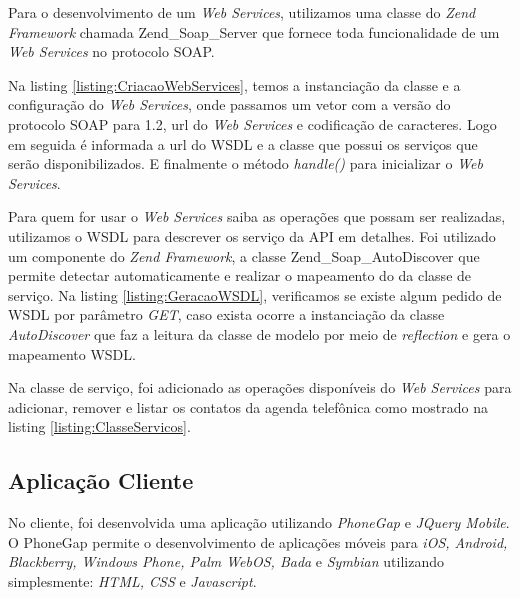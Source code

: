 \documentclass{acm_proc_article-sp}
\begin{document}
	Para o desenvolvimento de um \emph{Web Services}, utilizamos uma classe do \emph{Zend Framework} chamada Zend\_Soap\_Server que fornece toda funcionalidade de um \emph{Web Services} no protocolo SOAP. 
	
	Na listing \ref{listing:CriacaoWebServices}, temos a instanciação da classe e a configuração do \emph{Web Services}, onde passamos um vetor com a versão do protocolo SOAP para 1.2, url do \emph{Web Services} e codificação de caracteres. Logo em seguida é informada a url do WSDL e a classe que possui os serviços que serão disponibilizados. E finalmente o método \emph{handle()} para inicializar o \emph{Web Services}.
	
	
	
	Para quem for usar o \emph{Web Services} saiba as operações que possam ser realizadas, utilizamos o WSDL para descrever os serviço da API em detalhes. Foi utilizado um componente do \emph{Zend Framework}, a classe Zend\_Soap\_AutoDiscover que permite detectar automaticamente e realizar o mapeamento do da classe de serviço. Na listing \ref{listing:GeracaoWSDL}, verificamos se existe algum pedido de WSDL por parâmetro \emph{GET}, caso exista ocorre a instanciação da classe \emph{AutoDiscover} que faz a leitura da classe de modelo por meio de \emph{reflection} e gera o mapeamento WSDL.
	
	
	
	Na classe de serviço, foi adicionado as operações disponíveis do \emph{Web Services} para adicionar, remover e listar os contatos da agenda telefônica como mostrado na listing \ref{listing:ClasseServicos}.
	
	
	
	\subsection{Aplicação Cliente}
	
	No cliente, foi desenvolvida uma aplicação utilizando \emph{PhoneGap} e \emph{JQuery Mobile}. O PhoneGap permite o desenvolvimento de aplicações móveis para \emph{iOS, Android, Blackberry, Windows Phone, Palm WebOS, Bada} e \emph{Symbian} utilizando simplesmente: \emph{HTML, CSS} e \emph{Javascript}.\cite{PHONEGAPSITE}
	
\end{document}
